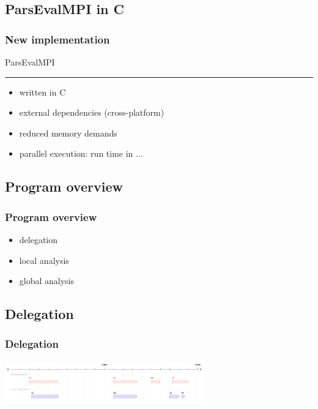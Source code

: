 \documentclass{beamer}
\begin{document}
\subsection{ParsEvalMPI in C}
\begin{frame}
  \frametitle{New implementation}
  { \LARGE ParsEvalMPI }
  \vspace{1px}
  \hrule
  \vspace{10px}

  \begin{itemize}
    \item<1-> written in C
    \item<2-> external dependencies (cross-platform)
    \item<3-> reduced memory demands
    \item<4-> parallel execution: run time in ...
  \end{itemize}
\end{frame}

\subsection{Program overview}
\begin{frame}
  \frametitle{Program overview}
  \begin{itemize}
    \item<2-> delegation
    \item<3-> local analysis
    \item<4-> global analysis
  \end{itemize}
\end{frame}

\subsection{Delegation}
\begin{frame}
  \frametitle{Delegation}
  \begin{center}
    \includegraphics[width=325px]{mock.png}
  \end{center}
\end{frame}
\end{document}
